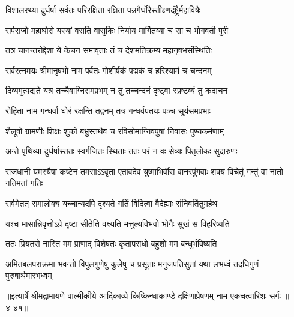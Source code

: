 \twolineshloka
{विशालरथ्या दुर्धर्षा सर्वतः परिरक्षिता}
{रक्षिता पन्नगैर्घोरैस्तीक्ष्णदंष्ट्रैर्महाविषैः} %

\twolineshloka
{सर्पराजो महाघोरो यस्यां वसति वासुकिः}
{निर्याय मार्गितव्या च सा च भोगवती पुरी} %

\twolineshloka
{तत्र चानन्तरोद्देशा ये केचन समावृताः}
{तं च देशमतिक्रम्य महानृषभसंस्थितिः} %

\twolineshloka
{सर्वरत्नमयः श्रीमानृषभो नाम पर्वतः}
{गोशीर्षकं पद्मकं च हरिश्यामं च चन्दनम्} %

\twolineshloka
{दिव्यमुत्पद्यते यत्र तच्चैवाग्निसमप्रभम्}
{न तु तच्चन्दनं दृष्ट्वा स्प्रष्टव्यं तु कदाचन} %

\twolineshloka
{रोहिता नाम गन्धर्वा घोरं रक्षन्ति तद्वनम्}
{तत्र गन्धर्वपतयः पञ्च सूर्यसमप्रभाः} %

\twolineshloka
{शैलूषो ग्रामणीः शिक्षः शुको बभ्रुस्तथैव च}
{रविसोमाग्निवपुषां निवासः पुण्यकर्मणाम्} %

\twolineshloka
{अन्ते पृथिव्या दुर्धर्षास्ततः स्वर्गजितः स्थिताः}
{ततः परं न वः सेव्यः पितृलोकः सुदारुणः} %

\threelineshloka
{राजधानी यमस्यैषा कष्टेन तमसाऽऽवृता}
{एतावदेव युष्माभिर्वीरा वानरपुंगवाः}
{शक्यं विचेतुं गन्तुं वा नातो गतिमतां गतिः} %

\twolineshloka
{सर्वमेतत् समालोक्य यच्चान्यदपि दृश्यते}
{गतिं विदित्वा वैदेह्याः संनिवर्तितुमर्हथ} %

\twolineshloka
{यश्च मासान्निवृत्तोऽग्रे दृष्टा सीतेति वक्ष्यति}
{मत्तुल्यविभवो भोगैः सुखं स विहरिष्यति} %

\twolineshloka
{ततः प्रियतरो नास्ति मम प्राणाद् विशेषतः}
{कृतापराधो बहुशो मम बन्धुर्भविष्यति} %

\twolineshloka
{अमितबलपराक्रमा भवन्तो विपुलगुणेषु कुलेषु च प्रसूताः}
{मनुजपतिसुतां यथा लभध्वं तदधिगुणं पुरुषार्थमारभध्वम्} %


॥इत्यार्षे श्रीमद्रामायणे वाल्मीकीये आदिकाव्ये किष्किन्धाकाण्डे दक्षिणाप्रेषणम् नाम एकचत्वारिंशः सर्गः ॥४-४१॥
